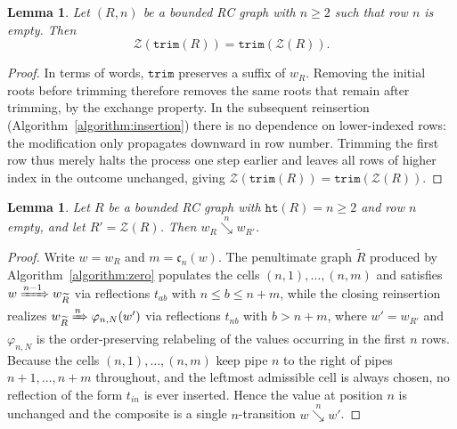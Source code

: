 \documentclass{amsart}
\newtheorem{lemma}[theorem]{Lemma}
\theoremstyle{definition}
\theoremstyle{remark}
\newcommand{\code}{\mathfrak{c}}
\newcommand{\wof}[1]{w_{#1}}
\newcommand{\hr}{\mathtt{ht}}
\newcommand{\Tom}[1]{\xRightarrow{#1}}
\newcommand{\downvar}[1]{\stackrel{#1}{\searrow}}
\newcommand{\trm}{\mathtt{trim}}
\newcommand{\zeromap}{\mathcal{Z}}
\begin{document}
\begin{lemma}\label{lemma:ztrim}
Let $(R,n)$ be a bounded RC graph with $n\geq 2$ such that row $n$ is empty. Then
\[
\zeromap(\trm(R))=\trm(\zeromap(R)).
\]
\end{lemma}
\begin{proof}
In terms of words, $\trm$ preserves a suffix of $\wof{R}$. Removing the initial roots before trimming therefore removes the same roots that remain after trimming, by the exchange property. In the subsequent reinsertion (Algorithm~\ref{algorithm:insertion}) there is no dependence on lower-indexed rows: the modification only propagates downward in row number. Trimming the first row thus merely halts the process one step earlier and leaves all rows of higher index in the outcome unchanged, giving $\zeromap(\trm(R))=\trm(\zeromap(R))$.
\end{proof}

\begin{lemma}\label{lemma:zerotransition}
Let $R$ be a bounded RC graph with $\hr(R)=n\geq 2$ and row $n$ empty, and let $R'=\zeromap(R)$. Then $\wof{R}\downvar{n}\wof{R'}$.
\end{lemma}
\begin{proof}
Write $w=\wof{R}$ and $m=\code_n(w)$. The penultimate graph $\widetilde{R}$ produced by Algorithm~\ref{algorithm:zero} populates the cells $(n,1),\ldots,(n,m)$ and satisfies $w\Tom{n-1}\wof{\widetilde{R}}$ via reflections $t_{ab}$ with $n\leq b\leq n+m$, while the closing reinsertion realizes $\wof{\widetilde{R}}\Tom{n}\varphi_{n,N}(w')$ via reflections $t_{nb}$ with $b>n+m$, where $w'=\wof{R'}$ and $\varphi_{n,N}$ is the order-preserving relabeling of the values occurring in the first $n$ rows. Because the cells $(n,1),\ldots,(n,m)$ keep pipe $n$ to the right of pipes $n+1,\ldots,n+m$ throughout, and the leftmost admissible cell is always chosen, no reflection of the form $t_{in}$ is ever inserted. Hence the value at position $n$ is unchanged and the composite is a single $n$-transition $w\downvar{n}w'$.
\end{proof}
\end{document}
